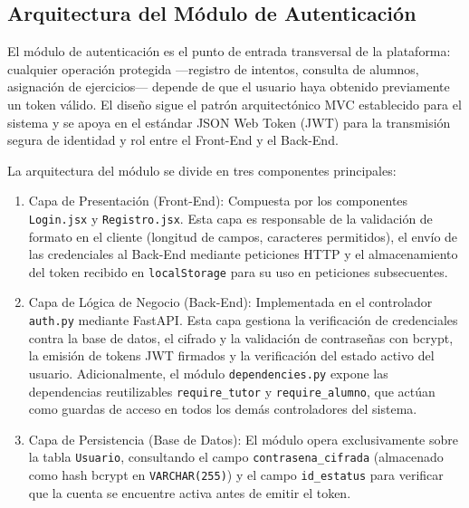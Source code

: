 \subsection{Arquitectura del Módulo de Autenticación}
 
El módulo de autenticación es el punto de entrada transversal de la
plataforma: cualquier operación protegida —registro de intentos, consulta
de alumnos, asignación de ejercicios— depende de que el usuario haya
obtenido previamente un token válido. El diseño sigue el patrón
arquitectónico MVC establecido para el sistema y se apoya en el estándar
JSON Web Token (JWT) para la transmisión segura de identidad y rol entre
el Front-End y el Back-End.
 
La arquitectura del módulo se divide en tres componentes principales:
 
\begin{enumerate}
    \item Capa de Presentación (Front-End): Compuesta por los
    componentes \texttt{Login.jsx} y \texttt{Registro.jsx}. Esta capa es
    responsable de la validación de formato en el cliente (longitud de
    campos, caracteres permitidos), el envío de las credenciales al
    Back-End mediante peticiones HTTP y el almacenamiento del token
    recibido en \texttt{localStorage} para su uso en peticiones
    subsecuentes.
 
    \item Capa de Lógica de Negocio (Back-End): Implementada
    en el controlador \texttt{auth.py} mediante FastAPI. Esta capa
    gestiona la verificación de credenciales contra la base de datos,
    el cifrado y la validación de contraseñas con bcrypt, la emisión de
    tokens JWT firmados y la verificación del estado activo del usuario.
    Adicionalmente, el módulo \texttt{dependencies.py} expone las
    dependencias reutilizables \texttt{require\_tutor} y
    \texttt{require\_alumno}, que actúan como guardas de acceso en todos
    los demás controladores del sistema.
 
    \item Capa de Persistencia (Base de Datos): El módulo opera
    exclusivamente sobre la tabla \texttt{Usuario}, consultando el campo
    \texttt{contrasena\_cifrada} (almacenado como hash bcrypt en
    \texttt{VARCHAR(255)}) y el campo \texttt{id\_estatus} para verificar
    que la cuenta se encuentre activa antes de emitir el token.
\end{enumerate}
 
